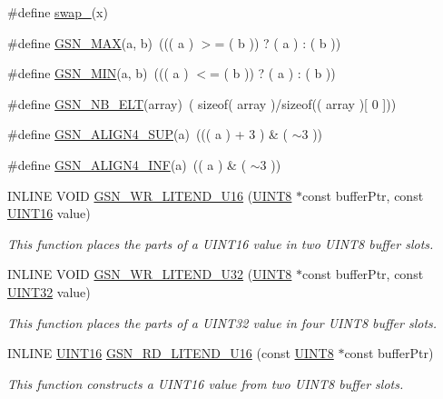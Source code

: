 \begin{DoxyCompactItemize}
\item 
\#define \hyperlink{a00634_gab2242ecb8ffd8b5fb6a1647a5b1c9f2a}{swap\_}(x)
\item 
\#define \hyperlink{a00634_ga1eb2a90e9ab14824a64a2f6a62b37890}{GSN\_\-MAX}(a, b)~((( a ) $>$= ( b )) ? ( a ) : ( b ))
\item 
\#define \hyperlink{a00634_gaca41fe743680cba6df3cbecbc9ab08a9}{GSN\_\-MIN}(a, b)~((( a ) $<$= ( b )) ? ( a ) : ( b ))
\item 
\#define \hyperlink{a00634_ga98384a3c4b654dfd7254b0ff4cfb425b}{GSN\_\-NB\_\-ELT}(array)~( sizeof( array )/sizeof(( array )\mbox{[} 0 \mbox{]}))
\item 
\#define \hyperlink{a00634_ga3f85373e426f9724f7a911dfbd36e090}{GSN\_\-ALIGN4\_\-SUP}(a)~((( a ) + 3 ) \& ( $\sim$3 ))
\item 
\#define \hyperlink{a00634_ga38c4278d40641d58d348be55a4fd91da}{GSN\_\-ALIGN4\_\-INF}(a)~(( a ) \& ( $\sim$3 ))
\item 
INLINE VOID \hyperlink{a00634_ga93c806730a69f0c559fda3ef2e14ff8e}{GSN\_\-WR\_\-LITEND\_\-U16} (\hyperlink{a00660_gab27e9918b538ce9d8ca692479b375b6a}{UINT8} $\ast$const bufferPtr, const \hyperlink{a00660_ga09f1a1fb2293e33483cc8d44aefb1eb1}{UINT16} value)
\begin{DoxyCompactList}\small\item\em This function places the parts of a UINT16 value in two UINT8 buffer slots. \end{DoxyCompactList}\item 
INLINE VOID \hyperlink{a00634_gab1d0f5affe1791a54558477434c44f81}{GSN\_\-WR\_\-LITEND\_\-U32} (\hyperlink{a00660_gab27e9918b538ce9d8ca692479b375b6a}{UINT8} $\ast$const bufferPtr, const \hyperlink{a00660_gae1e6edbbc26d6fbc71a90190d0266018}{UINT32} value)
\begin{DoxyCompactList}\small\item\em This function places the parts of a UINT32 value in four UINT8 buffer slots. \end{DoxyCompactList}\item 
INLINE \hyperlink{a00660_ga09f1a1fb2293e33483cc8d44aefb1eb1}{UINT16} \hyperlink{a00634_ga93374a2fc02fc77a519bb8c23b9968a5}{GSN\_\-RD\_\-LITEND\_\-U16} (const \hyperlink{a00660_gab27e9918b538ce9d8ca692479b375b6a}{UINT8} $\ast$const bufferPtr)
\begin{DoxyCompactList}\small\item\em This function constructs a UINT16 value from two UINT8 buffer slots. \end{DoxyCompactList}\item 

\end{DoxyCompactItemize}
